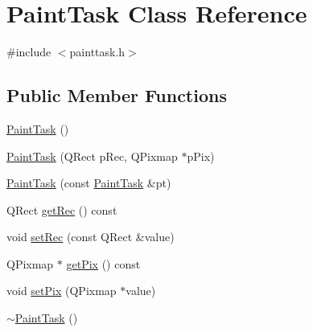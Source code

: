 \hypertarget{class_paint_task}{\section{Paint\-Task Class Reference}
\label{class_paint_task}
}


{\ttfamily \#include $<$painttask.\-h$>$}

\subsection*{Public Member Functions}
\begin{DoxyCompactItemize}
\item 
\hyperlink{class_paint_task_a2aa88e0fcfba6ad080be91f41a59bbf4}{Paint\-Task} ()
\item 
\hyperlink{class_paint_task_a95c518e8d1f1b47513fcbb7d33efae92}{Paint\-Task} (Q\-Rect p\-Rec, Q\-Pixmap $\ast$p\-Pix)
\item 
\hyperlink{class_paint_task_aa6a868686cea358b91056a7bdd17c39c}{Paint\-Task} (const \hyperlink{class_paint_task}{Paint\-Task} \&pt)
\item 
Q\-Rect \hyperlink{class_paint_task_a2cfc517eefcaf5190c3c138402edf24a}{get\-Rec} () const 
\item 
void \hyperlink{class_paint_task_a589af1cb82beb781e4cc34027f73bdf0}{set\-Rec} (const Q\-Rect \&value)
\item 
Q\-Pixmap $\ast$ \hyperlink{class_paint_task_ad32c94ebc7a9b5640179ccbf00a0398e}{get\-Pix} () const 
\item 
void \hyperlink{class_paint_task_aba6f4430d04a3202950719145f89597c}{set\-Pix} (Q\-Pixmap $\ast$value)
\item 
\hyperlink{class_paint_task_afef0bf47a784b0556299141f79159109}{$\sim$\-Paint\-Task} ()
\end{DoxyCompactItemize}


